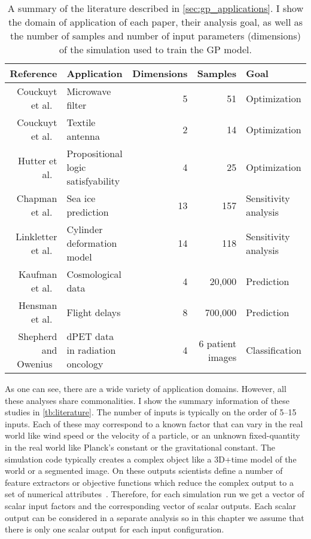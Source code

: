 \begin{table}[htb]
\centering
\caption[A summary of the literature using Gaussian process models]{%
  A summary of the literature described in \autoref{sec:gp_applications}.  I
  show the domain of application of each paper, their analysis goal, as
  well as the number of samples and number of input parameters (dimensions)
  of the simulation used to train the GP model. 
}
\label{tb:literature}
\begin{adjustbox}{max width=\linewidth}
\begin{tabular}{|r|lrrl|}
  \hline
  Reference & Application & Dimensions & Samples & Goal \\
  \hline
  Couckuyt et al.~\cite{Couckuyt:2010} & Microwave filter & 5 & 51 & Optimization \\
  Couckuyt et al.~\cite{Couckuyt:2010} & Textile antenna & 2 & 14 & Optimization \\
  Hutter et al.~\cite{Hutter:2010} & Propositional logic satisfyability & 4 & 25 & Optimization \\
  Chapman et al.~\cite{Chapman:1994} & Sea ice prediction & 13 & 157 & Sensitivity analysis \\
  Linkletter et al.~\cite{Linkletter:2006} & Cylinder deformation model & 14 & 118 & Sensitivity analysis \\
  Kaufman et al.~\cite{Kaufman:2011} & Cosmological data  & 4 & 20,000 & Prediction \\
  Hensman et al.~\cite{Hensman:2013} & Flight delays & 8 & 700,000 & Prediction \\
  Shepherd and Owenius~\cite{Shepherd:2012} & dPET data in radiation oncology & 4 & 6 patient images & Classification \\
  \hline
\end{tabular}
\end{adjustbox}
\end{table}

As one can see, there are a wide variety of application domains.  However, 
all these analyses share commonalities.
I show the summary information of these studies in \autoref{tb:literature}.
The number of inputs is typically on
the order of 5--15 inputs. Each of these may correspond to a known factor that
can vary in the real world like wind speed or the velocity of a particle, or
an unknown fixed-quantity in the real world like Planck's constant or the
gravitational constant.  The simulation code typically creates a complex
object like a 3D+time model of the world or a segmented image. On these
outputs scientists define a number of feature extractors or objective
functions which reduce the complex output to a set of numerical 
attributes~\cite{Sedlmair:2014}.
Therefore, for each simulation run we get a vector of scalar input factors and
the corresponding vector of scalar outputs.  Each scalar output can be
considered in a separate analysis so in this chapter we assume that there is
only one scalar output for each input configuration.

